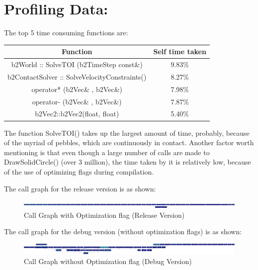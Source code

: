 \documentclass{article}
\begin{document}
\newpage

\section*{Profiling Data:}
The top 5 time consuming functions are:
\begin{center}
\begin{tabular}{ |c|c| } 
\hline

 Function & Self time taken\\
 \hline
 b2World :: SolveTOI (b2TimeStep const\&)  & 9.83\% \\
 b2ContactSolver :: SolveVelocityConstraints() & 8.27\% \\
 operator* (b2Vec\& , b2Vec\&)  & 7.98\% \\ 
 operator- (b2Vec\& , b2Vec\&)  & 7.87\% \\ 
 b2Vec2::b2Vec2(float, float)& 5.40\% \\
 \hline
\end{tabular}
\end{center}

The function SolveTOI() takes up the largest amount of time, probably, because of the myriad of pebbles, which are continuously in contact. Another factor worth mentioning is that even though a large number of calls are made to DrawSolidCircle() (over 3 million), the time taken by it is relatively low, because of the use of optimizing flags during compilation. 

The call graph for the release version is as shown:
\begin{figure} [h]
    \centering
    \includegraphics [scale=0.05] {profiles/profile.png}
    \caption{Call Graph with Optimization flag (Release Version)}
\end{figure} 

The call graph for the debug version (without optimization flags) is as shown:
\begin{figure} [h]
    \centering
    \includegraphics [scale=0.05] {profiles/profile_debug.png}
    \caption{Call Graph without Optimization flag (Debug Version)}
\end{figure} 

\newpage
\end{document}
